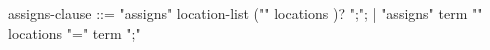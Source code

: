 \begin{syntax}
assigns-clause ::= "assigns" location-list ("\from" locations )? ";";
                 | "assigns" term "\from" locations {"=" term ";"}
\end{syntax}
